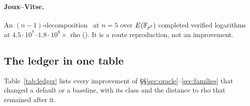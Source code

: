 \paragraph{Joux--Vitse.} An $(n-1)$-decomposition~\cite{jouxvitse2012} at
$n=5$ over $E(\mathbb{F}_{p^5})$ completed verified logarithms at
$4.5\cdot10^7$--$1.8\cdot10^8\times$ rho
(). It is a route reproduction, not an
improvement.

\subsection{The ledger in one table}

Table~\ref{tab:ledger} lists every improvement of
\S\S\ref{sec:oracle}--\ref{sec:families} that changed a default or a
baseline, with its class and the distance to rho that remained after it.

